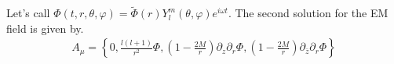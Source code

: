 \documentclass[12pt]{article}
\begin{document}
Let's call $\Phi(t,r,\theta,\varphi) = \tilde{\Phi}(r) Y_{l}^{m}(\theta,\varphi) e^{i \omega t}$. The second solution for the EM field is given by.
\begin{gather}
A_{\mu}
=
\left\{
0, \frac{l (l+1)}{r^{2}}
\Phi
,
(1 - \frac{2 M}{r})
\partial_{z}\partial_{r}\Phi
,
(1 - \frac{2 M}{r})
\partial_{\bar{z}}\partial_{r}\Phi
\right\}
\end{gather}





































%
%
\end{document}
